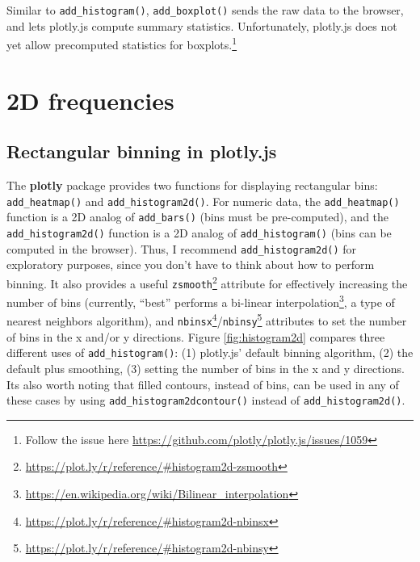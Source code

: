 \documentclass[
  12pt,
]{krantz}
\renewcommand{\href}[2]{#2\footnote{\url{#1}}}
\begin{document}
Similar to \texttt{add\_histogram()}, \texttt{add\_boxplot()} sends the raw data to the browser, and lets plotly.js compute summary statistics. Unfortunately, plotly.js does not yet allow precomputed statistics for boxplots.\footnote{Follow the issue here \url{https://github.com/plotly/plotly.js/issues/1059}}

\hypertarget{frequencies-2D}{%
\chapter{2D frequencies}\label{frequencies-2D}}

\hypertarget{rectangular-binning-in-plotly.js}{%
\section{Rectangular binning in plotly.js}\label{rectangular-binning-in-plotly.js}}

The \textbf{plotly} package provides two functions for displaying rectangular bins: \texttt{add\_heatmap()} and \texttt{add\_histogram2d()}. For numeric data, the \texttt{add\_heatmap()} function is a 2D analog of \texttt{add\_bars()} (bins must be pre-computed), and the \texttt{add\_histogram2d()} function is a 2D analog of \texttt{add\_histogram()} (bins can be computed in the browser). Thus, I recommend \texttt{add\_histogram2d()} for exploratory purposes, since you don't have to think about how to perform binning. It also provides a useful \href{https://plot.ly/r/reference/\#histogram2d-zsmooth}{\texttt{zsmooth}} attribute for effectively increasing the number of bins (currently, ``best'' performs a \href{https://en.wikipedia.org/wiki/Bilinear_interpolation}{bi-linear interpolation}, a type of nearest neighbors algorithm), and \href{https://plot.ly/r/reference/\#histogram2d-nbinsx}{\texttt{nbinsx}}/\href{https://plot.ly/r/reference/\#histogram2d-nbinsy}{\texttt{nbinsy}} attributes to set the number of bins in the x and/or y directions. Figure \ref{fig:histogram2d} compares three different uses of \texttt{add\_histogram()}: (1) plotly.js' default binning algorithm, (2) the default plus smoothing, (3) setting the number of bins in the x and y directions. Its also worth noting that filled contours, instead of bins, can be used in any of these cases by using \texttt{add\_histogram2dcontour()} instead of \texttt{add\_histogram2d()}.
\end{document}
